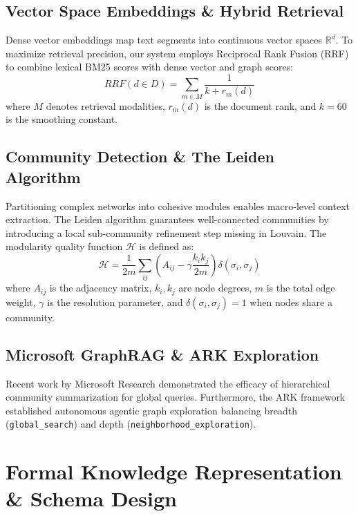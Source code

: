 \documentclass[11pt,a4paper]{report}
\begin{document}
\section{Vector Space Embeddings \& Hybrid Retrieval}
Dense vector embeddings map text segments into continuous vector spaces $\mathbb{R}^d$. To maximize retrieval precision, our system employs Reciprocal Rank Fusion (RRF) to combine lexical BM25 scores with dense vector and graph scores:
\begin{equation}
RRF(d \in D) = \sum_{m \in M} \frac{1}{k + r_m(d)}
\end{equation}
where $M$ denotes retrieval modalities, $r_m(d)$ is the document rank, and $k = 60$ is the smoothing constant.

\section{Community Detection \& The Leiden Algorithm}
Partitioning complex networks into cohesive modules enables macro-level context extraction. The Leiden algorithm guarantees well-connected communities by introducing a local sub-community refinement step missing in Louvain. The modularity quality function $\mathcal{H}$ is defined as:
\begin{equation}
\mathcal{H} = \frac{1}{2m} \sum_{ij} \left( A_{ij} - \gamma \frac{k_i k_j}{2m} \right) \delta(\sigma_i, \sigma_j)
\end{equation}
where $A_{ij}$ is the adjacency matrix, $k_i, k_j$ are node degrees, $m$ is the total edge weight, $\gamma$ is the resolution parameter, and $\delta(\sigma_i, \sigma_j) = 1$ when nodes share a community.

\section{Microsoft GraphRAG \& ARK Exploration}
Recent work by Microsoft Research \cite{edge2024graphrag} demonstrated the efficacy of hierarchical community summarization for global queries. Furthermore, the ARK framework \cite{polonuer2026ark} established autonomous agentic graph exploration balancing breadth (\texttt{global\_search}) and depth (\texttt{neighborhood\_exploration}).

\chapter{Formal Knowledge Representation \& Schema Design}
\end{document}
